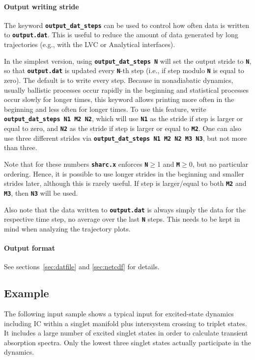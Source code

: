 \documentclass[a4paper,10pt,DIV=15,openany]{scrbook}
\newcommand{\ttt}[1]{\textbf{\texttt{#1}}}
\begin{document}
\paragraph{Output writing stride}

The keyword \ttt{output\_dat\_steps} can be used to control how often data is written to \ttt{output.dat}.
This is useful to reduce the amount of data generated by long trajectories (e.g., with the LVC or Analytical interfaces).

In the simplest version, using \ttt{output\_dat\_steps N} will set the output stride to \ttt{N}, so that \ttt{output.dat} is updated every \ttt{N}-th step (i.e., if step modulo \ttt{N} is equal to zero).
The default is to write every step.
Because in nonadiabatic dynamics, usually ballistic processes occur rapidly in the beginning and statistical processes occur slowly for longer times, this keyword allows printing more often in the beginning and less often for longer times.
To use this feature, write \ttt{output\_dat\_steps N1 M2 N2}, which will use \ttt{N1} as the stride if step is larger or equal to zero, and \ttt{N2} as the stride if step is larger or equal to \ttt{M2}.
One can also use three different strides via \ttt{output\_dat\_steps N1 M2 N2 M3 N3}, but not more than three.

Note that for these numbers \ttt{sharc.x} enforces \ttt{N}$\geq$1 and \ttt{M}$\geq$0, but no particular ordering.
Hence, it is possible to use longer strides in the beginning and smaller strides later, although this is rarely useful.
If step is larger/equal to both \ttt{M2} and \ttt{M3}, then \ttt{N3} will be used.

Also note that the data written to \ttt{output.dat} is always simply the data for the respective time step, no average over the last \ttt{N} steps.
This needs to be kept in mind when analyzing the trajectory plots.

\paragraph{Output format}

See sections~\ref{sec:datfile} and \ref{sec:netcdf} for details.





\subsection{Example}

The following input sample shows a typical input for excited-state dynamics including IC within a singlet manifold plus intersystem crossing to triplet states. It includes a large number of excited singlet states in order to calculate transient absorption spectra. Only the lowest three singlet states actually participate in the dynamics. 
\end{document}
